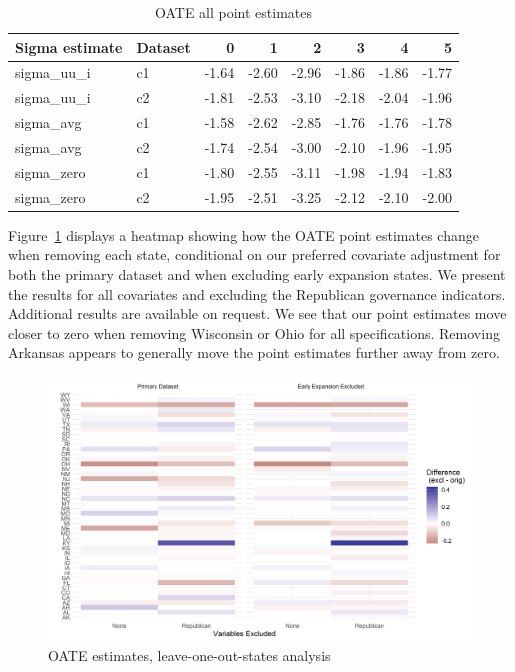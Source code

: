 \documentclass[aoas]{imsart}
\theoremstyle{plain}
\theoremstyle{remark}
\begin{document}
\begin{appendix}
\begin{table}[ht]
\centering
\caption{OATE all point estimates}
\label{tab:oatesensitive}
\begin{tabular}{llrrrrrr}
  \hline
Sigma estimate & Dataset & 0 & 1 & 2 & 3 & 4 & 5 \\ 
  \hline
sigma\_uu\_i & c1 & -1.64 & -2.60 & -2.96 & -1.86 & -1.86 & -1.77 \\ 
  sigma\_uu\_i & c2 & -1.81 & -2.53 & -3.10 & -2.18 & -2.04 & -1.96 \\ 
  sigma\_avg & c1 & -1.58 & -2.62 & -2.85 & -1.76 & -1.76 & -1.78 \\ 
  sigma\_avg & c2 & -1.74 & -2.54 & -3.00 & -2.10 & -1.96 & -1.95 \\ 
  sigma\_zero & c1 & -1.80 & -2.55 & -3.11 & -1.98 & -1.94 & -1.83 \\ 
  sigma\_zero & c2 & -1.95 & -2.51 & -3.25 & -2.12 & -2.10 & -2.00 \\ 
   \hline
\end{tabular}
\end{table}

Figure~\ref{fig:oateheatmap} displays a heatmap showing how the OATE point estimates change when removing each state, conditional on our preferred covariate adjustment for both the primary dataset and when excluding early expansion states. We present the results for all covariates and excluding the Republican governance indicators. Additional results are available on request. We see that our point estimates move closer to zero when removing Wisconsin or Ohio for all specifications. Removing Arkansas appears to generally move the point estimates further away from zero.

\begin{figure}[]
\begin{center}
    \caption{OATE estimates, leave-one-out-states analysis}
    \label{fig:oateheatmap}
    \includegraphics[scale=0.6]{01_Plots/oate-loo-state-cov-group-heatmap-states.png}
\end{center}
\end{figure}

\end{appendix}
\end{document}
